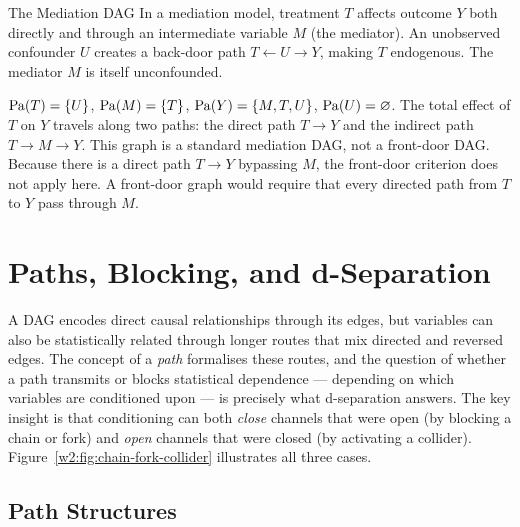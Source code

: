 \documentclass[master.tex]{subfiles}
\begin{document}
\begin{example}{The Mediation DAG}
In a mediation model, treatment $T$ affects outcome $Y$ both directly and
through an intermediate variable $M$ (the mediator).  An unobserved confounder
$U$ creates a back-door path $T \leftarrow U \rightarrow Y$, making $T$
endogenous.  The mediator $M$ is itself unconfounded.

\begin{center}
\end{center}

$\mathrm{Pa}(T) = \{U\}$, $\mathrm{Pa}(M) = \{T\}$,
$\mathrm{Pa}(Y) = \{M, T, U\}$, $\mathrm{Pa}(U) = \varnothing$.
The total effect of $T$ on $Y$ travels along two paths: the direct path
$T \to Y$ and the indirect path $T \to M \to Y$.
This graph is a standard mediation DAG, not a front-door DAG.
Because there is a direct path $T \to Y$ bypassing $M$, the front-door
criterion does not apply here.
A front-door graph would require that every directed path from $T$ to $Y$
pass through $M$.
\end{example}

\section{Paths, Blocking, and d-Separation}

A DAG encodes direct causal relationships through its edges, but variables
can also be statistically related through longer routes that mix directed
and reversed edges.  The concept of a \emph{path} formalises these routes,
and the question of whether a path transmits or blocks statistical
dependence --- depending on which variables are conditioned upon --- is
precisely what d-separation answers.  The key insight is that conditioning
can both \emph{close} channels that were open (by blocking a chain or fork)
and \emph{open} channels that were closed (by activating a collider).
Figure~\ref{w2:fig:chain-fork-collider} illustrates all three cases.

\subsection{Path Structures}
\end{document}
